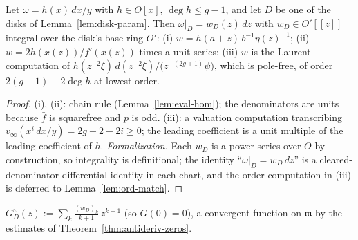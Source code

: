 \begin{lemma}
\label{lem:omega-expansion}
\leanok
{}
Let $\omega = h(x)\,dx/y$ with $h \in O[x]$, $\deg h \le g-1$, and let $D$ be one of the
disks of Lemma~\ref{lem:disk-param}. Then $\omega|_{D} = w_D(z)\,dz$ with
$w_D \in O'[[z]]$ integral over the disk's base ring $O'$:
(i) $w = h(a+z)\,b^{-1}\eta(z)^{-1}$;
(ii) $w = 2h(x(z))/f'(x(z))$ times a unit series;
(iii) $w$ is the Laurent computation of
$h(z^{-2}\xi)\,d(z^{-2}\xi)\big/\bigl(z^{-(2g+1)}\psi\bigr)$, which is pole-free, of
order $2(g-1) - 2\deg h$ at lowest order.
\end{lemma}
\begin{proof}
\leanok
(i), (ii): chain rule (Lemma~\ref{lem:eval-hom}); the denominators are units because
$\bar f$ is squarefree and $p$ is odd. (iii): a valuation computation transcribing
$v_\infty(x^i\, dx/y) = 2g-2-2i \ge 0$; the leading coefficient is a unit multiple of
the leading coefficient of $h$. \emph{Formalization.} Each $w_D$ is a power series over
$O$ by construction, so integrality is definitional; the identity
``$\omega|_D = w_D\,dz$'' is a cleared-denominator differential identity in each chart,
and the order computation in (iii) is deferred to Lemma~\ref{lem:ord-match}.
\end{proof}

\begin{definition}
\label{def:disk-antider}
\leanok
{}
$G^{\omega}_{D}(z) := \sum_k \tfrac{(w_D)_k}{k+1}\,z^{k+1}$ (so $G(0) = 0$), a
convergent function on $\mathfrak m$ by the estimates of
Theorem~\ref{thm:antideriv-zeros}.
\end{definition}

